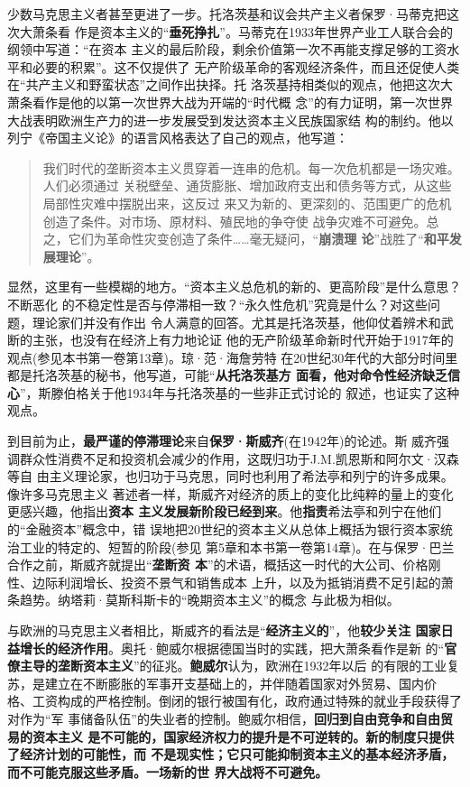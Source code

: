 少数马克思主义者甚至更进了一步。托洛茨基和议会共产主义者保罗·马蒂克把这次大萧条看
作是资本主义的“\textbf{垂死挣扎}”。马蒂克在1933年世界产业工人联合会的纲领中写道：“在资本
主义的最后阶段，剩余价值第一次不再能支撑足够的工资水平和必要的积累”。这不仅提供了
无产阶级革命的客观经济条件，而且还促使人类在“共产主义和野蛮状态”之间作出抉择。托
洛茨基持相类似的观点，他把这次大萧条看作是他的以第一次世界大战为开端的“时代概
念”的有力证明，第一次世界大战表明欧洲生产力的进一步发展受到发达资本主义民族国家结
构的制约。他以列宁《帝国主义论》的语言风格表达了自己的观点，他写道：
\begin{quotation}
我们时代的垄断资本主义贯穿着一连串的危机。每一次危机都是一场灾难。人们必须通过
关税壁垒、通货膨胀、增加政府支出和债务等方式，从这些局部性灾难中摆脱出来，这反过
来又为新的、更深刻的、范围更广的危机创造了条件。对市场、原材料、殖民地的争夺使
战争灾难不可避免。总之，它们为革命性灾变创造了条件……毫无疑问，“\textbf{崩溃理
论}”战胜了“\textbf{和平发展理论}”。
\end{quotation}

显然，这里有一些模糊的地方。“资本主义总危机的新的、更高阶段”是什么意思？不断恶化
的不稳定性是否与停滞相一致？“永久性危机”究竟是什么？对这些问题，理论家们并没有作出
令人满意的回答。尤其是托洛茨基，他仰仗着辨术和武断的主张，也没有在经济上有力地论证
他的无产阶级革命新时代开始于1917年的观点(参见本书第一卷第13章)。琼·范·海詹劳特
在20世纪30年代的大部分时间里都是托洛茨基的秘书，他写道，可能“\textbf{从托洛茨基方
面看，他对命令性经济缺乏信心}”，斯滕伯格关于他1934年与托洛茨基的一些非正式讨论的
叙述，也证实了这种观点。


到目前为止，\textbf{最严谨的停滞理论}来自\textbf{保罗·斯威齐}(在1942年)的论述。斯
威齐强调群众性消费不足和投资机会减少的作用，这既归功于J.M.凯恩斯和阿尔文·汉森等自
由主义理论家，也归功于马克思，同时也利用了希法亭和列宁的许多成果。像许多马克思主义
著述者一样，斯威齐对经济的质上的变化比纯粹的量上的变化更感兴趣，他指出\textbf{资本
主义发展新阶段已经到来}。他\textbf{指责}希法亭和列宁在他们的“金融资本”概念中，错
误地把20世纪的资本主义从总体上概括为银行资本家统治工业的特定的、短暂的阶段(参见
第5章和本书第一卷第14章)。在与保罗·巴兰合作之前，斯威齐就提出“\textbf{垄断资
本}”的术语，概括这一时代的大公司、价格刚性、边际利润增长、投资不景气和销售成本
上升，以及为抵销消费不足引起的萧条趋势。纳塔莉·莫斯科斯卡的“晚期资本主义”的概念
与此极为相似。

与欧洲的马克思主义者相比，斯威齐的看法是“\textbf{经济主义的}”，他\textbf{较少关注
国家日益增长的经济作用}。奥托·鲍威尔根据德国当时的实践，把大萧条看作是新
的“\textbf{官僚主导的垄断资本主义}”的征兆。\textbf{鲍威尔}认为，欧洲在1932年以后
的有限的工业复苏，是建立在不断膨胀的军事开支基础上的，并伴随着国家对外贸易、国内价
格、工资构成的严格控制。倒闭的银行被国有化，政府通过特殊的就业手段获得了对作为“军
事储备队伍”的失业者的控制。鲍威尔相信，\textbf{回归到自由竞争和自由贸易的资本主义
是不可能的，国家经济权力的提升是不可逆转的。新的制度只提供了经济计划的可能性，而
不是现实性；它只可能抑制资本主义的基本经济矛盾，而不可能克服这些矛盾。一场新的世
界大战将不可避免。}

